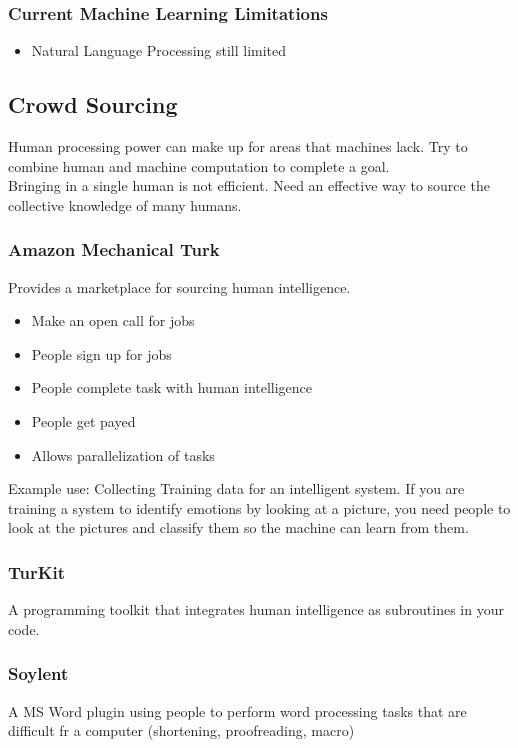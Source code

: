 \documentclass[12pt]{article}
\begin{document}
\subsubsection{Current Machine Learning Limitations}
\begin{itemize}
  \item Natural Language Processing still limited
\end{itemize}

\subsection{Crowd Sourcing}
Human processing power can make up for areas that machines lack. Try to combine
human and machine computation to complete a goal.\\
Bringing in a single human is not efficient. Need an effective way to source
the collective knowledge of many humans.\\
\subsubsection{Amazon Mechanical Turk}
Provides a marketplace for sourcing human intelligence.
\begin{itemize}
  \item Make an open call for jobs
  \item People sign up for jobs
  \item People complete task with human intelligence
  \item People get payed
  \item Allows parallelization of tasks
\end{itemize}
Example use: Collecting Training data for an intelligent system. If you are
training a system to identify emotions by looking at a picture, you need people
to look at the pictures and classify them so the machine can learn from them.

\subsubsection{TurKit}
A programming toolkit that integrates human intelligence as subroutines in your
code.

\subsubsection{Soylent}
A MS Word plugin using people to perform word processing tasks that are
difficult fr a computer (shortening, proofreading, macro)
\end{document}
